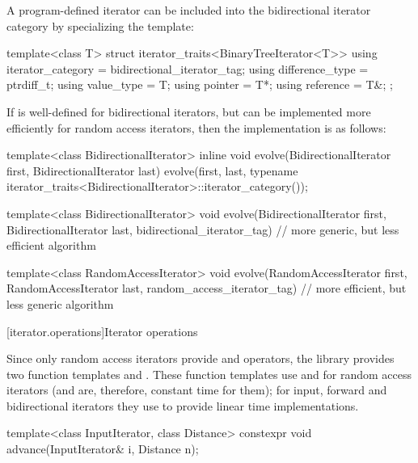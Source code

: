 \pnum
\begin{example}
A program-defined iterator 
can be included into the bidirectional iterator category by
specializing the  template:

\begin{codeblock}
template<class T> struct iterator_traits<BinaryTreeIterator<T>> {
  using iterator_category = bidirectional_iterator_tag;
  using difference_type   = ptrdiff_t;
  using value_type        = T;
  using pointer           = T*;
  using reference         = T&;
};
\end{codeblock}
\end{example}

\pnum
\begin{example}
If
is well-defined for bidirectional iterators, but can be implemented more
efficiently for random access iterators, then the implementation is as follows:

\begin{codeblock}
template<class BidirectionalIterator>
inline void
evolve(BidirectionalIterator first, BidirectionalIterator last) {
  evolve(first, last,
    typename iterator_traits<BidirectionalIterator>::iterator_category());
}

template<class BidirectionalIterator>
void evolve(BidirectionalIterator first, BidirectionalIterator last,
  bidirectional_iterator_tag) {
  // more generic, but less efficient algorithm
}

template<class RandomAccessIterator>
void evolve(RandomAccessIterator first, RandomAccessIterator last,
  random_access_iterator_tag) {
  // more efficient, but less generic algorithm
}
\end{codeblock}
\end{example}

[iterator.operations]{Iterator operations}

\pnum
Since only random access iterators provide
\tcode{+}
and
\tcode{-}
operators, the library provides two
function templates
and
.
These
function templates
use
\tcode{+}
and
\tcode{-}
for random access iterators (and are, therefore, constant
time for them); for input, forward and bidirectional iterators they use
\tcode{++}
to provide linear time
implementations.

%
\begin{itemdecl}
template<class InputIterator, class Distance>
  constexpr void advance(InputIterator& i, Distance n);
\end{itemdecl}

